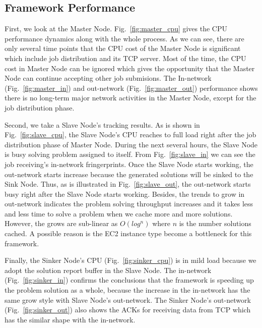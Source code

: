 \subsection{Framework Performance}
First, we look at the Master Node. Fig.~\ref{fig:master_cpu} gives the CPU performance dynamics along with the whole process. As we can see, there are only several time points that the CPU cost of the Master Node is significant which include job distribution and its TCP server. Most of the time, the CPU cost in Master Node can be ignored which gives the opportunity that the Master Node can continue accepting other job submisions. The In-network (Fig.~\ref{fig:master_in}) and out-network (Fig.~\ref{fig:master_out}) performance shows there is no long-term major network activities in the Master Node, except for the job distribution phase.

Second, we take a Slave Node's tracking results. As is shown in Fig.~\ref{fig:slave_cpu}, the Slave Node's CPU reaches to full load right after the job distribution phase of Master Node. During the next several hours, the Slave Node is busy solving problem assigned to itself. From Fig.~\ref{fig:slave_in} we can see the job receiving's in-network fringerprints. Once the Slave Node starts working, the out-network starts increase because the generated solutions will be sinked to the Sink Node. Thus, as is illustrated in Fig.~\ref{fig:slave_out}, the out-network starts busy right after the Slave Node starts working. Besides, the trends to grow in out-network indicates the problem solving throughput increases and it takes less and less time to solve a problem when we cache more and more solutions. However, the grows are sub-linear as $O(log^n)$ where $n$ is the number solutions cached. A possible reason is the EC2 instance type become a bottleneck for this framework.

Finally, the Sinker Node's CPU (Fig.~\ref{fig:sinker_cpu}) is in mild load because we adopt the solution report buffer in the Slave Node. The in-network (Fig.~\ref{fig:sinker_in}) confirms the conclusions that the framework is speeding up the problem solution as a whole, because the increase in the in-network has the same grow style with Slave Node's out-network. The Sinker Node's out-network (Fig.~\ref{fig:sinker_out}) also shows the ACKs for receiving data from TCP which has the similar shape with the in-network.

